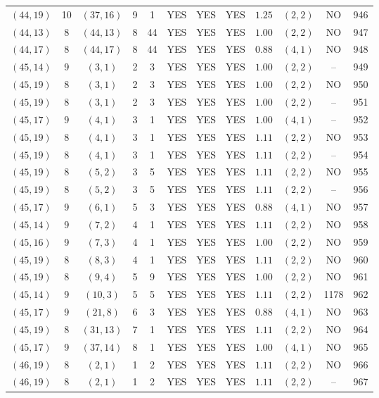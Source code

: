 \begin{longtable}{|c|c|c|c|c|c|c|c|c|c|c|c|}
$(44,19)$ & 10 & $(37,16)$ & 9 & 1 & YES & YES & YES & $1.25$ & $(2,2)$ & NO & 946\\
$(44,13)$ & 8 & $(44,13)$ & 8 & 44 & YES & YES & YES & $1.00$ & $(2,2)$ & NO & 947\\
$(44,17)$ & 8 & $(44,17)$ & 8 & 44 & YES & YES & YES & $0.88$ & $(4,1)$ & NO & 948\\
$(45,14)$ & 9 & $(3,1)$ & 2 & 3 & YES & YES & YES & $1.00$ & $(2,2)$ & -- & 949\\
$(45,19)$ & 8 & $(3,1)$ & 2 & 3 & YES & YES & YES & $1.00$ & $(2,2)$ & NO & 950\\
$(45,19)$ & 8 & $(3,1)$ & 2 & 3 & YES & YES & YES & $1.00$ & $(2,2)$ & -- & 951\\
$(45,17)$ & 9 & $(4,1)$ & 3 & 1 & YES & YES & YES & $1.00$ & $(4,1)$ & -- & 952\\
$(45,19)$ & 8 & $(4,1)$ & 3 & 1 & YES & YES & YES & $1.11$ & $(2,2)$ & NO & 953\\
$(45,19)$ & 8 & $(4,1)$ & 3 & 1 & YES & YES & YES & $1.11$ & $(2,2)$ & -- & 954\\
$(45,19)$ & 8 & $(5,2)$ & 3 & 5 & YES & YES & YES & $1.11$ & $(2,2)$ & NO & 955\\
$(45,19)$ & 8 & $(5,2)$ & 3 & 5 & YES & YES & YES & $1.11$ & $(2,2)$ & -- & 956\\
$(45,17)$ & 9 & $(6,1)$ & 5 & 3 & YES & YES & YES & $0.88$ & $(4,1)$ & NO & 957\\
$(45,14)$ & 9 & $(7,2)$ & 4 & 1 & YES & YES & YES & $1.11$ & $(2,2)$ & NO & 958\\
$(45,16)$ & 9 & $(7,3)$ & 4 & 1 & YES & YES & YES & $1.00$ & $(2,2)$ & NO & 959\\
$(45,19)$ & 8 & $(8,3)$ & 4 & 1 & YES & YES & YES & $1.11$ & $(2,2)$ & NO & 960\\
$(45,19)$ & 8 & $(9,4)$ & 5 & 9 & YES & YES & YES & $1.00$ & $(2,2)$ & NO & 961\\
$(45,14)$ & 9 & $(10,3)$ & 5 & 5 & YES & YES & YES & $1.11$ & $(2,2)$ & 1178 & 962\\
$(45,17)$ & 9 & $(21,8)$ & 6 & 3 & YES & YES & YES & $0.88$ & $(4,1)$ & NO & 963\\
$(45,19)$ & 8 & $(31,13)$ & 7 & 1 & YES & YES & YES & $1.11$ & $(2,2)$ & NO & 964\\
$(45,17)$ & 9 & $(37,14)$ & 8 & 1 & YES & YES & YES & $1.00$ & $(4,1)$ & NO & 965\\
$(46,19)$ & 8 & $(2,1)$ & 1 & 2 & YES & YES & YES & $1.11$ & $(2,2)$ & NO & 966\\
$(46,19)$ & 8 & $(2,1)$ & 1 & 2 & YES & YES & YES & $1.11$ & $(2,2)$ & -- & 967\\

\end{longtable}
